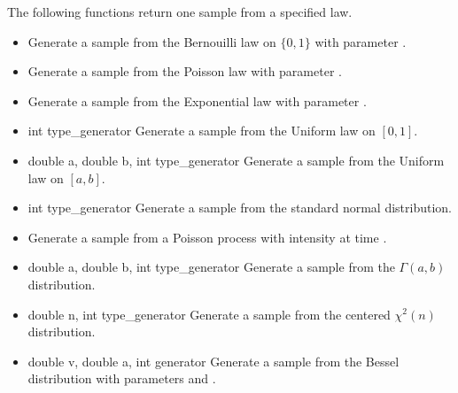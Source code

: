 The following functions return one sample from a specified law.
\begin{itemize}
\item {}
  \sshortdescribe Generate a sample from the Bernouilli law on $\{0, 1\}$ with
  parameter .

\item {}
  \sshortdescribe Generate a sample from the Poisson law with
  parameter .

\item {}
  \sshortdescribe Generate a sample from the Exponential law with
  parameter .

\item {} {int type_generator}
  \sshortdescribe Generate a sample from the Uniform law on $[0, 1]$.

\item {} {double a, double b, int
    type_generator}
  \sshortdescribe Generate a sample from the Uniform law on $[a, b]$.

\item {} {int type_generator}
  \sshortdescribe Generate a sample from the standard normal distribution.

\item {}
  \sshortdescribe Generate a sample from a Poisson process with intensity
   at time .

\item {} {double a, double b, int type_generator}
  \sshortdescribe Generate a sample from the $\Gamma(a, b)$ distribution.

\item {} {double n, int type_generator}
  \sshortdescribe Generate a sample from the centered $\chi^2(n)$ distribution.
\item {} {double v, double a, int generator}
  \sshortdescribe Generate a sample from the Bessel distribution with parameters
   and .
\end{itemize}

